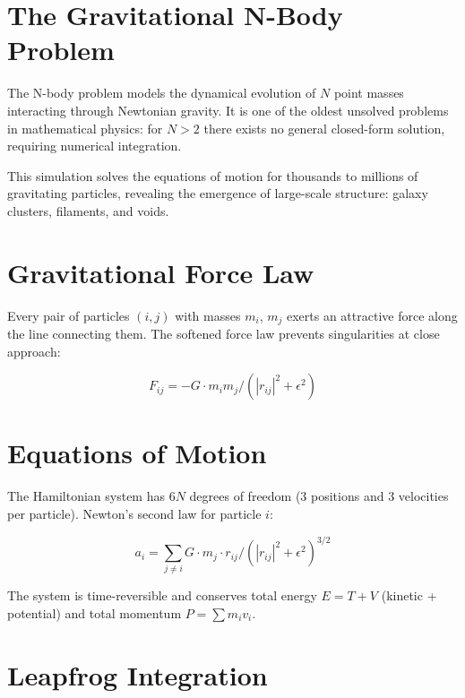 \section{The Gravitational N-Body Problem}

The N-body problem models the dynamical evolution of $N$ point masses
interacting through Newtonian gravity. It is one of the oldest unsolved
problems in mathematical physics: for $N > 2$ there exists no general
closed-form solution, requiring numerical integration.

This simulation solves the equations of motion for thousands to millions
of gravitating particles, revealing the emergence of large-scale
structure: galaxy clusters, filaments, and voids.

\section{Gravitational Force Law}

Every pair of particles $(i, j)$ with masses $m_i$, $m_j$ exerts an
attractive force along the line connecting them. The softened force
law prevents singularities at close approach:

\begin{equation}
F_{ij} = -G \cdot m_i m_j / (|r_{ij}|^2 + \epsilon^2)
\end{equation}


\section{Equations of Motion}

The Hamiltonian system has $6N$ degrees of freedom (3 positions and
3 velocities per particle). Newton's second law for particle $i$:

\begin{equation}
a_i = \sum_{j \neq i} G \cdot m_j \cdot r_{ij} / (|r_{ij}|^2 + \epsilon^2)^{3/2}
\end{equation}

The system is time-reversible and conserves total energy
$E = T + V$ (kinetic + potential) and total momentum $P = \sum m_i v_i$.

\section{Leapfrog Integration}

